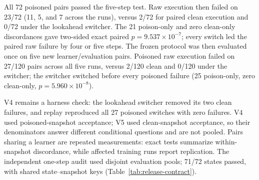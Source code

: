 All 72 poisoned pairs passed the five-step test.  Raw execution then
failed on 23/72 (11, 5, and 7 across the runs), versus 2/72 for paired clean
execution and 0/72 under the lookahead switcher.  The 21 poison-only and
zero clean-only discordances gave two-sided exact paired
$p=9.537\times10^{-7}$; every switch led the paired raw failure by four or five
steps.  The frozen protocol was then evaluated once on five new
learner/evaluation pairs.  Poisoned raw execution failed on 27/120 pairs across
all five runs, versus 2/120 clean and 0/120 under the switcher; the switcher
switched before every poisoned failure (25 poison-only, zero clean-only,
$p=5.960\times10^{-8}$).

V4 remains a harness check: the lookahead switcher removed its two clean failures,
and replay reproduced all 27 poisoned switches with zero failures.  V4 used
poisoned-snapshot acceptance; V5 used clean-snapshot acceptance, so their
denominators answer different conditional questions and are not pooled.
Pairs sharing a learner are repeated measurements: exact tests summarize
within-snapshot discordance, while affected training runs report replication.
The independent one-step audit used disjoint evaluation pools; 71/72 states
passed, with shared state--snapshot keys (Table~\ref{tab:release-contract}).

